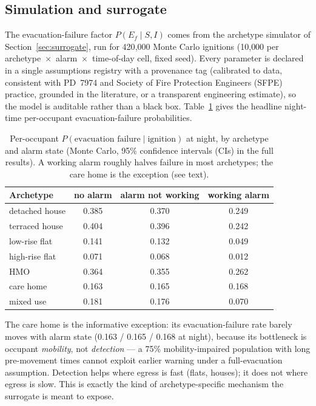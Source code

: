 \subsection{Simulation and surrogate}
\label{sec:results-sim}

The evacuation-failure factor $P(E_f\mid S,I)$ comes from the archetype simulator
of Section~\ref{sec:surrogate}, run for 420{,}000 Monte Carlo ignitions (10{,}000
per archetype~$\times$~alarm~$\times$~time-of-day cell, fixed seed). Every parameter
is declared in a single assumptions registry with a provenance tag (calibrated to
data, consistent with PD~7974 and Society of Fire Protection Engineers (SFPE)
practice, grounded in the literature, or a transparent engineering estimate), so
the model is auditable rather than a black box. Table~\ref{tab:sim} gives the
headline night-time per-occupant evacuation-failure probabilities.

\begin{table}[htbp]
  \centering
  \caption{Per-occupant $P(\text{evacuation failure}\mid\text{ignition})$ at
  night, by archetype and alarm state (Monte Carlo, 95\% confidence intervals (CIs)
  in the full results).
  A working alarm roughly halves failure in most archetypes; the care home is the
  exception (see text).}
  \label{tab:sim}
  \small
  \begin{tabular}{@{}lccc@{}}
    \toprule
    Archetype & no alarm & alarm not working & working alarm \\
    \midrule
    detached house & 0.385 & 0.370 & 0.249 \\
    terraced house & 0.404 & 0.396 & 0.242 \\
    low-rise flat  & 0.141 & 0.132 & 0.049 \\
    high-rise flat & 0.071 & 0.068 & 0.012 \\
    HMO            & 0.364 & 0.355 & 0.262 \\
    care home      & 0.163 & 0.165 & 0.168 \\
    mixed use      & 0.181 & 0.176 & 0.070 \\
    \bottomrule
  \end{tabular}
\end{table}

The care home is the informative exception: its evacuation-failure rate barely
moves with alarm state (0.163 / 0.165 / 0.168 at night), because its bottleneck is
occupant \emph{mobility}, not \emph{detection} --- a 75\% mobility-impaired
population with long pre-movement times cannot exploit earlier warning under a
full-evacuation assumption. Detection helps where egress is fast (flats, houses);
it does not where egress is slow. This is exactly the kind of archetype-specific
mechanism the surrogate is meant to expose.

